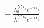 \documentclass[preview]{standalone}
\begin{document}
\begin{align*}
= \frac{\lambda_0^{\sum x_i} e^{-n\lambda_0}}{\lambda_1^{\sum x_i} e^{-n\lambda_1}}
\end{align*}
\end{document}
